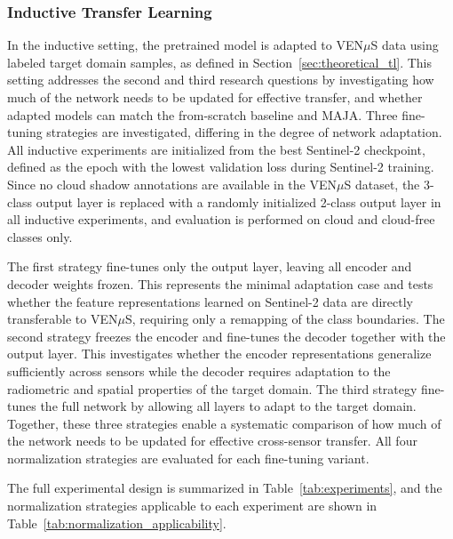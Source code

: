 \subsubsection{Inductive Transfer Learning}

In the inductive setting, the pretrained model is adapted to VEN$\mu$S data using labeled target domain samples, as defined in Section~\ref{sec:theoretical_tl}. This setting addresses the second and third research questions by investigating how much of the network needs to be updated for effective transfer, and whether adapted models can match the from-scratch baseline and MAJA. Three fine-tuning strategies are investigated, differing in the degree of network adaptation. All inductive experiments are initialized from the best Sentinel-2 checkpoint, defined as the epoch with the lowest validation loss during Sentinel-2 training. Since no cloud shadow annotations are available in the VEN$\mu$S dataset, the 3-class output layer is replaced with a randomly initialized 2-class output layer in all inductive experiments, and evaluation is performed on cloud and cloud-free classes only.

The first strategy fine-tunes only the output layer, leaving all encoder and decoder weights frozen. This represents the minimal adaptation case and tests whether the feature representations learned on Sentinel-2 data are directly transferable to VEN$\mu$S, requiring only a remapping of the class boundaries. The second strategy freezes the encoder and fine-tunes the decoder together with the output layer. This investigates whether the encoder representations generalize sufficiently across sensors while the decoder requires adaptation to the radiometric and spatial properties of the target domain. The third strategy fine-tunes the full network by allowing all layers to adapt to the target domain. Together, these three strategies enable a systematic comparison of how much of the network needs to be updated for effective cross-sensor transfer. All four normalization strategies are evaluated for each fine-tuning variant.

The full experimental design is summarized in Table~\ref{tab:experiments}, and the normalization strategies applicable to each experiment are shown in Table~\ref{tab:normalization_applicability}.

